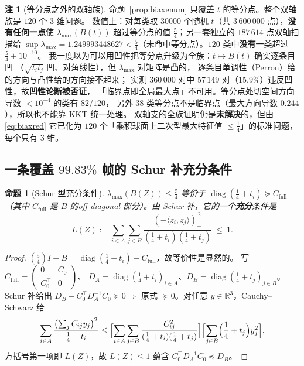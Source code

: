 \documentclass[UTF8,11pt]{ctexart}
\newtheorem{proposition}[theorem]{命题}
\theoremstyle{definition}
\newtheorem{remark}[theorem]{注}
\newcommand{\R}{\mathbb{R}}
\begin{document}
\begin{remark}[等分点之外的双轴族]\label{rmk:biaxfull}
命题~\ref{prop:biaxenum} 只覆盖 $t$ 的等分点。整个双轴族是 $120$ 个 $3$ 维问题。
数值上：对每类取 $30000$ 个随机 $t$（共 $3\,600\,000$ 点），\textbf{没有任何一点}使
$\lambda_{\max}(B(t))$ 超过等分点的值 $\frac54$；另一套独立的 $187\,614$ 点双轴扫描给
$\sup\lambda_{\max}=1.249993448627<\frac54$（未命中等分点）。$120$ 类中\textbf{没有}一类超过 $\frac54+10^{-10}$。
我一度以为可以用凹性把等分点升级为全族：$t\mapsto B(t)$ 确实逐条目凹
（$\sqrt{t_it_j}$ 凹、对角线性），但 $\lambda_{\max}$ 对矩阵是\textbf{凸}的，
逐条目单调性（Perron）给的方向与凸性给的方向接不起来；
实测 $360\,000$ 对中 $57\,149$ 对（$15.9\%$）违反凹性，故\textbf{凹性论断被否证}，
「临界点即全局最大点」不可用。等分点处切空间方向导数 $<10^{-4}$ 的类有 $82/120$，
另外 $38$ 类等分点不是临界点（最大方向导数 $0.244$），所以也不能靠 KKT 统一处理。
双轴支的全族证明仍是\textbf{未解决}的，但由 \eqref{eq:biaxred} 它已化为
$120$ 个「乘积球面上二次型最大特征值 $\le\frac14$」的标准问题，每个只有 $3$ 维。
\end{remark}

\subsection{一条覆盖 $99.83\%$ 帧的 Schur 补充分条件}\label{sec:schur}

\begin{proposition}[Schur 型充分条件]\label{prop:schurcond}
$\lambda_{\max}(B(Z))\le\frac54$ 等价于 $\operatorname{diag}(\frac14+t_i)\succeq C_{\mathrm{full}}$
（其中 $C_{\mathrm{full}}$ 是 $B$ 的off-diagonal 部分）。由 Schur 补，它的一个\textbf{充分}条件是
\begin{equation}\label{eq:schurS}
L(Z):=\sum_{i\in A}\sum_{j\in B}
\frac{(-\langle z_i,z_j\rangle)_+^{\,2}}{(\frac14+t_i)(\frac14+t_j)}\ \le\ 1 .
\end{equation}
\end{proposition}

\begin{proof}
$(\frac54)I-B=\operatorname{diag}(\frac14+t_i)-C_{\mathrm{full}}$，故等价性是显然的。
写 $C_{\mathrm{full}}=\left(\begin{smallmatrix}0&C_0\\ C_0^\top&0\end{smallmatrix}\right)$、
$D_A=\operatorname{diag}(\frac14+t_i)_{i\in A}$、$D_B=\operatorname{diag}(\frac14+t_j)_{j\in B}$。
Schur 补给出 $D_B-C_0^\top D_A^{-1}C_0\succeq0\Rightarrow$ 原式 $\succeq0$。对任意 $y\in\R^3$，Cauchy--Schwarz 给
\[
\sum_{i\in A}\frac{\bigl(\sum_jC_{ij}y_j\bigr)^2}{\frac14+t_i}
\le\Bigl[\sum_{i\in A}\sum_{j\in B}\frac{C_{ij}^2}{(\frac14+t_i)(\frac14+t_j)}\Bigr]
\Bigl[\sum_{j\in B}\Bigl(\frac14+t_j\Bigr)y_j^2\Bigr],
\]
方括号第一项即 $L(Z)$，故 $L(Z)\le1$ 蕴含 $C_0^\top D_A^{-1}C_0\preceq D_B$。
\end{proof}
\end{document}
